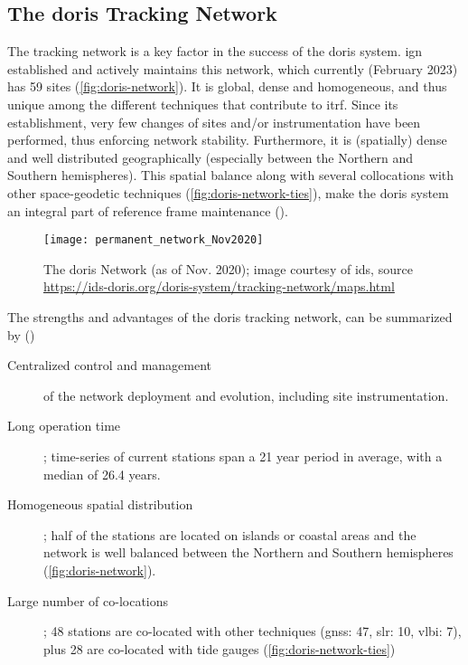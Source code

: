 \iffalse
\begin{description}
  \item[Atmospheric Studies] including troposphere () and ionosphere ()
  \item[Reference Frames] \cite{Willis2007}
  \item[Space Weather and Solar Activity] \cite{Willis2005}
  \item[Tectonics] \cite{}
\end{description}
\fi

\subsection{The \gls{doris} Tracking Network}\label{ssec:doris-tracking-network}
The tracking network is a key factor in the success of the \gls{doris} system. 
\gls{ign} established and actively maintains this network, which currently (February
 2023) has 59 sites (\autoref{fig:doris-network}). It is global, dense 
and homogeneous, and thus unique among the different techniques that contribute to 
\gls{itrf}. Since its establishment, very few changes of sites and/or instrumentation 
have been performed, thus enforcing network stability. Furthermore, it is (spatially) 
dense and well distributed geographically (especially between the Northern and  
Southern hemispheres). This spatial balance along with several collocations with 
other space-geodetic techniques (\autoref{fig:doris-network-ties}), make the 
\gls{doris} system an integral part of reference frame maintenance (\cite{Moreaux2022}).

\begin{figure}[h]
  \centering
  \texttt{[image: permanent\_network\_Nov2020]}
  \caption{The \gls{doris} Network (as of Nov. 2020); image courtesy of \gls{ids}, source \url{https://ids-doris.org/doris-system/tracking-network/maps.html}}
  \label{fig:doris-network}
\end{figure}

The strengths and advantages of the \gls{doris} tracking network, can be summarized 
by (\cite{Soudarin2019})
\begin{description}
  \item[Centralized control and management] of the network deployment and evolution, 
    including site instrumentation.
  \item[Long operation time]; time-series of current stations span a 21 year period in average, 
    with a median of 26.4 years.
  \item[Homogeneous spatial distribution]; half of the stations are located on 
    islands or coastal areas and the network is well balanced between the 
    Northern and Southern hemispheres (\autoref{fig:doris-network}).
  \item[Large number of co-locations]; 48 stations are co-located with 
    other techniques (\gls{gnss}: 47, \gls{slr}: 10, \gls{vlbi}: 7), plus 28 are 
    co-located with tide gauges (\autoref{fig:doris-network-ties})
\end{description}

